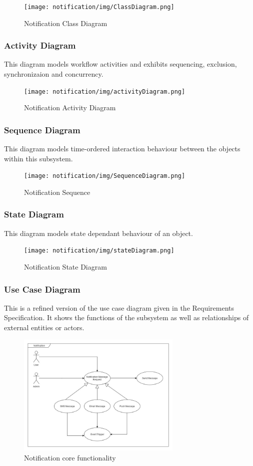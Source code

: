 \begin{figure}[H]
	\centering
	\texttt{[image: notification/img/ClassDiagram.png]}
	\caption{Notification Class Diagram}
\end{figure}

\newpage
\subsubsection{Activity Diagram}
This diagram models workflow activities and exhibits sequencing, exclusion, synchronizaion and concurrency.
\begin{figure}[H]
	\centering
	\texttt{[image: notification/img/activityDiagram.png]}
	\caption{Notification Activity Diagram}
\end{figure}


\subsubsection{Sequence Diagram}
This diagram models time-ordered interaction behaviour between the objects within this subsystem.
\begin{figure}[H]
	\centering
	\texttt{[image: notification/img/SequenceDiagram.png]}
	\caption{Notification Sequence}
\end{figure}

\newpage
\subsubsection{State Diagram}
This diagram models state dependant behaviour of an object.
\begin{figure}[H]
	\centering
	\texttt{[image: notification/img/stateDiagram.png]}
	\caption{Notification State Diagram}
\end{figure}




\subsubsection{Use Case Diagram}
This is a refined version of the use case diagram given in the Requirements Specification. It shows the functions of the subsystem as well as relationships of external entities or actors.
\begin{figure}[H]
	\centering
	\includegraphics[width=0.7\textwidth]{notification/img/NotificationUseCase.jpg}
	\caption{Notification core functionality }
\end{figure}
